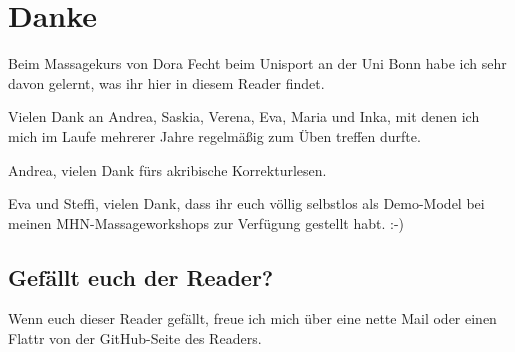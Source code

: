 \section*{Danke}

Beim Massagekurs von Dora Fecht beim Unisport an der Uni Bonn habe ich sehr davon gelernt, was ihr hier in diesem Reader findet.

Vielen Dank an Andrea, Saskia, Verena, Eva, Maria und Inka, mit denen ich mich im Laufe mehrerer Jahre regelmäßig zum Üben treffen durfte.

Andrea, vielen Dank fürs akribische Korrekturlesen.

Eva und Steffi, vielen Dank, dass ihr euch völlig selbstlos als Demo-Model bei meinen MHN-Massageworkshops zur Verfügung gestellt habt. :-)

\subsection*{Gefällt euch der Reader?}

Wenn euch dieser Reader gefällt, freue ich mich über eine nette Mail oder einen Flattr von der GitHub-Seite des Readers.
